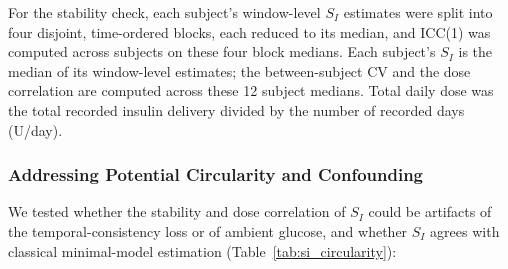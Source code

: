 \documentclass[journal]{IEEEtran}
\begin{document}
For the stability check, each subject's window-level $S_I$ estimates were split into four disjoint, time-ordered blocks, each reduced to its median, and ICC(1) was computed across subjects on these four block medians. Each subject's $S_I$ is the median of its window-level estimates; the between-subject CV and the dose correlation are computed across these 12 subject medians. Total daily dose was the total recorded insulin delivery divided by the number of recorded days (U/day).

\begin{table}[t]
\centering
\caption{Pre-specified checks of insulin sensitivity}
\label{tab:si}
\footnotesize
{}
\end{table}

\subsubsection{Addressing Potential Circularity and Confounding}
We tested whether the stability and dose correlation of $S_I$ could be artifacts of the temporal-consistency loss or of ambient glucose, and whether $S_I$ agrees with classical minimal-model estimation (Table~\ref{tab:si_circularity}):
\end{document}
